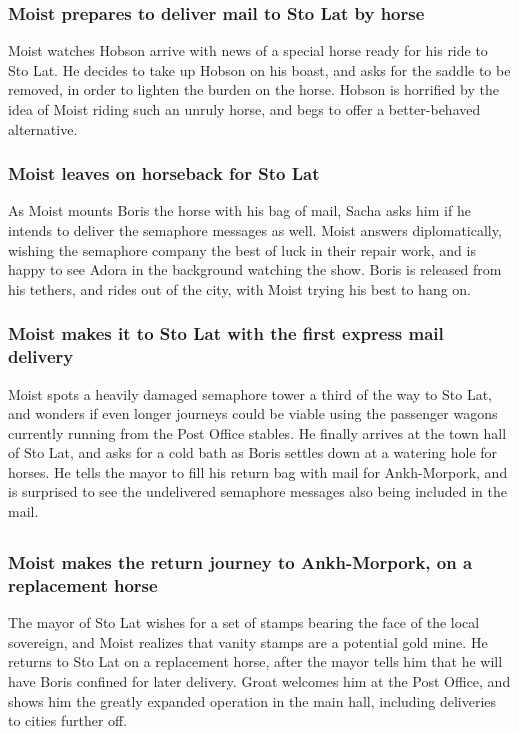 \subsubsection{\Gls{Moist} prepares to deliver mail to Sto Lat by horse}
\Gls{Moist} watches \Gls{Hobson} arrive with news of a special horse ready for his ride to Sto Lat.
He decides to take up \Gls{Hobson} on his boast, and asks for the saddle to be removed, in order to
lighten the burden on the horse. \Gls{Hobson} is horrified by the idea of \Gls{Moist} riding such
an unruly horse, and begs to offer a better-behaved alternative.

\subsubsection{\Gls{Moist} leaves on horseback for Sto Lat}
As \Gls{Moist} mounts \Gls{Boris} the horse with his bag of mail, \Gls{Sacha} asks him if he intends
to deliver the semaphore messages as well. \Gls{Moist} answers diplomatically, wishing the semaphore
company the best of luck in their repair work, and is happy to see \Gls{Adora} in the background
watching the show. \Gls{Boris} is released from his tethers, and rides out of the city, with
\Gls{Moist} trying his best to hang on.

\subsubsection{\Gls{Moist} makes it to Sto Lat with the first express mail delivery}
\Gls{Moist} spots a heavily damaged semaphore tower a third of the way to Sto Lat, and wonders if
even longer journeys could be viable using the passenger wagons currently running from the Post
Office stables. He finally arrives at the town hall of Sto Lat, and asks for a cold bath as
\Gls{Boris} settles down at a watering hole for horses. He tells the mayor to fill his return bag
with mail for Ankh-Morpork, and is surprised to see the undelivered semaphore messages also being
included in the mail.

\subsection{}
\subsubsection{\Gls{Moist} makes the return journey to Ankh-Morpork, on a replacement horse}
The mayor of Sto Lat wishes for a set of stamps bearing the face of the local sovereign, and
\Gls{Moist} realizes that vanity stamps are a potential gold mine. He returns to Sto Lat on a
replacement horse, after the mayor tells him that he will have \Gls{Boris} confined for later
delivery. \Gls{Groat} welcomes him at the Post Office, and shows him the greatly expanded operation
in the main hall, including deliveries to cities further off.

